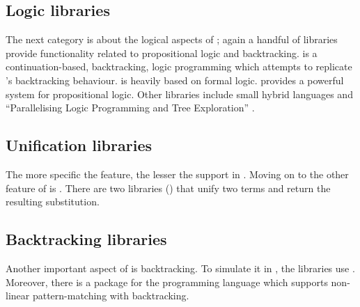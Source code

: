 \documentclass[thesis-solanki.tex]{subfiles}
\begin{document}
\subsection{Logic libraries}

The next category is about the logical aspects of ; again a handful of libraries provide
functionality related to propositional logic and backtracking.
\cite{logict-lib} is a continuation-based, backtracking, logic programming  which attempts
to replicate
's backtracking behaviour.
 is heavily based on formal logic.
\cite{proplogic-lib} provides a powerful system for propositional logic.
Other libraries include small hybrid languages \cite{cflp-lib} and ``Parallelising Logic Programming and Tree
Exploration'' \cite{logic-grows-on-trees-lib}.


\subsection{Unification libraries}

The more specific the feature, the lesser the support in .
Moving on to the other feature of  is .
There are two libraries (\cite{cmu-lib,unification-fd-lib}) that unify two  terms and return
the resulting substitution.


\subsection{Backtracking libraries}

Another important aspect of  is backtracking.
To simulate it in , the libraries \cite{stream-monad-lib, logicst-lib} use .
Moreover, there is a package for the  programming language \cite{egison-lib} which supports
non-linear pattern-matching with backtracking.
\end{document}
